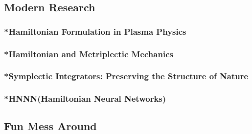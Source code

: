 \subsection{Modern Research}
\subsubsection{*Hamiltonian Formulation in Plasma Physics}
\subsubsection{*Hamiltonian and Metriplectic Mechanics}
\subsubsection{*Symplectic Integrators: Preserving the Structure of Nature}
\subsubsection{*HNNN(Hamiltonian Neural Networks)}
\subsection{Fun Mess Around}

